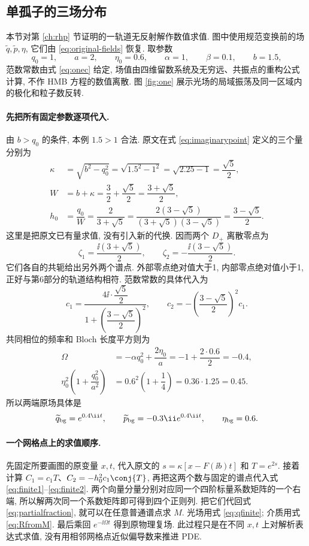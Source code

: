 \subsection{单孤子的三场分布}
本节对第 \ref{ch:rhp} 节证明的一轨道无反射解作数值求值. 图中使用规范变换前的场 $\widetilde q,\widetilde p,\eta$, 它们由 \eqref{eq:original-fields} 恢复. 取参数
\begin{equation}\label{eq:numerical-parameters}
q_0=1,\qquad a=2,\qquad\eta_0=0.6,\qquad
\alpha=1,\qquad\beta=0.1,\qquad b=1.5,
\end{equation}
范数常数由式 \eqref{eq:onec} 给定, 场值由四维留数系统及无穷远、共振点的重构公式计算, 不作 HMB 方程的数值离散. 图 \ref{fig:one} 展示光场的局域振荡及同一区域内的极化和粒子数反转.

\paragraph{先把所有固定参数逐项代入.}
由 $b>q_0$ 的条件, 本例 $1.5>1$ 合法. 原文在式 \eqref{eq:imaginarypoint} 定义的三个量分别为
\begin{align*}
\kappa&=\sqrt{b^2-q_0^2}=\sqrt{1.5^2-1^2}
=\sqrt{2.25-1}=\dfrac{\sqrt{5}}{2},\\
 W&=b+\kappa=\dfrac{3}{2}+\dfrac{\sqrt{5}}{2}
=\dfrac{3+\sqrt{5}}{2},\\
h_0&=\dfrac{q_0}{W}=\dfrac{2}{3+\sqrt{5}}
=\dfrac{2(3-\sqrt{5})}{(3+\sqrt{5})(3-\sqrt{5})}
=\dfrac{3-\sqrt{5}}{2}.
\end{align*}
这里是把原文已有量求值, 没有引入新的代换. 因而两个 $D_+$ 离散零点为
\[
\zeta_1=\dfrac{\ii(3+\sqrt{5})}{2},\qquad
\zeta_2=-\dfrac{\ii(3-\sqrt{5})}{2}.
\]
它们各自的共轭给出另外两个谱点. 外部零点绝对值大于1, 内部零点绝对值小于1, 正好与第6部分的轨道结构相符. 范数常数的具体代入为
\[
c_1=\dfrac{4\ii\cdot\dfrac{\sqrt{5}}{2}}
{1+\left(\dfrac{3-\sqrt{5}}{2}\right)^2},\qquad
c_2=-\left(\dfrac{3-\sqrt{5}}{2}\right)^2c_1.
\]
共同相位的频率和 Bloch 长度平方则为
\begin{align*}
\Omega&=-\alpha q_0^2+\dfrac{2\eta_0}{a}
=-1+\dfrac{2\cdot0.6}{2}=-0.4,\\
\eta_0^2\left(1+\dfrac{q_0^2}{a^2}\right)
&=0.6^2\left(1+\dfrac{1}{4}\right)
=0.36\cdot1.25=0.45.
\end{align*}
所以两端原场具体是
\[
\widetilde q_{\rm bg}=e^{0.4\ii t},\qquad
\widetilde p_{\rm bg}=-0.3\ii e^{0.4\ii t},\qquad
\eta_{\rm bg}=0.6.
\]

\paragraph{一个网格点上的求值顺序.}
先固定所要画图的原变量 $x,t$, 代入原文的 $s=\kappa[x-F(\ii b)t]$ 和 $T=e^{2s}$. 接着计算 $C_1=c_1T$、$C_2=-h_0^2c_1\conj{T}$, 再把这两个数与固定的谱点代入式 \eqref{eq:finite1}--\eqref{eq:finite2}. 两个向量分量分别对应同一个四阶标量系数矩阵的一个右端, 所以解两次同一个系数矩阵即可得到四个正则列. 把它们代回式 \eqref{eq:partialfraction}, 就可以在任意普通谱点求 $M$. 光场用式 \eqref{eq:qfinite}; 介质用式 \eqref{eq:RfromM}. 最后乘回 $e^{-\ii\Omega t}$ 得到原物理复场. 此过程只是在不同 $x,t$ 上对解析表达式求值, 没有用相邻网格点近似偏导数来推进 PDE.

